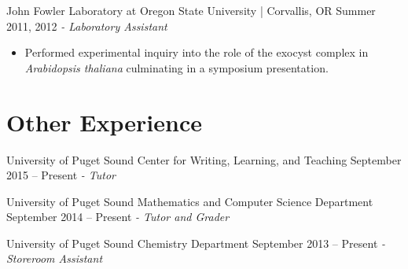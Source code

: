 \documentclass[letter]{res}
\begin{document}
\begin{resume}
 John Fowler Laboratory at Oregon State University | Corvallis, OR \hfill Summer 2011, 2012 \newline
\textit{- Laboratory Assistant} \\
 \vspace{-4.5mm}
 \begin{itemize}
 \item Performed experimental inquiry into the role of the exocyst complex in \textit{Arabidopsis thaliana} culminating in a symposium presentation.
 \end{itemize}
  \vspace{-3.5mm}
 
\section{Other Experience}
University of Puget Sound Center for Writing, Learning, and Teaching \hfill September 2015 – Present \newline 
\textit{ - Tutor}  \\
 \vspace{-4.5mm}
   \vspace{-3.5mm}

University of Puget Sound Mathematics and Computer Science Department \hfill  September 2014 – Present \newline
\textit{- Tutor and Grader} \\
  \vspace{-4.5mm}
    \vspace{-3.5mm}
    
University of Puget Sound Chemistry Department \hfill September 2013 – Present \newline 
\textit{- Storeroom Assistant} \\
  \vspace{-4.5mm}
    \vspace{-3.5mm}


\end{resume}
\end{document}
